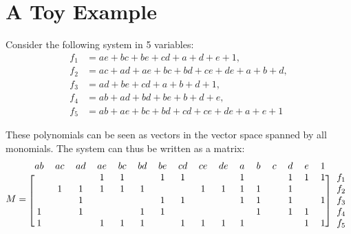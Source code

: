 \documentclass[a4paper]{article}
\begin{document}
\section{A Toy Example}

Consider the following system in 5 variables:
\begin{align*}
  f_1 &= ae + bc + be + cd + a + d + e + 1,\\
  f_2 &= ac + ad + ae + bc + bd + ce + de + a + b + d,\\
  f_3 &= ad + be + cd  + a + b + d + 1,\\
  f_4 &= ab + ad + bd + be + b + d + e,\\            
  f_5 &= ab + ae + bc + bd + cd + ce + de + a + e + 1
\end{align*}



These polynomials can be seen as vectors in the vector space spanned by all
monomials. The system can thus be written as a matrix:
\[
  M = \begin{blockarray}{ccccccccccccccccc}
  ab & ac & ad & ae & bc & bd & be & cd & ce & de & a & b & c & d & e & 1 & \\
  \begin{block}{[cccccccccccccccc]c}
     &    &    & 1  & 1  &    & 1  & 1  &    &    & 1 &   &   & 1 & 1 & 1 & f_1\\
     & 1  & 1  & 1  & 1  & 1  &    &    & 1  & 1  & 1 & 1 &   & 1 &   &   & f_2 \\
     &    & 1  &    &    &    & 1  & 1  &    &    & 1 & 1 &   & 1 &   & 1 & f_3 \\
   1 &    & 1  &    &    & 1  & 1  &    &    &    &   & 1 &   & 1 & 1 &   & f_4 \\
   1 &    &    & 1  & 1  & 1  &    & 1  & 1  & 1  & 1 &   &   &   & 1 & 1 & f_5 \\
    \end{block}
\end{blockarray}
\]
\end{document}

